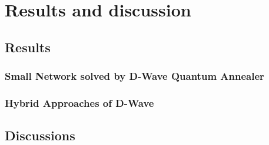
\chapter{Results and discussion} %

\label{Chapter5} %
\section{Results}
\subsection{Small Network solved by D-Wave Quantum Annealer}
\subsection{Hybrid Approaches of D-Wave}
\section{Discussions}
